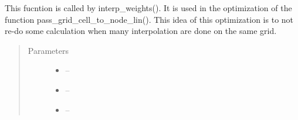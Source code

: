 \documentclass[letterpaper,10pt,english]{sphinxmanual}
\begin{document}
\begin{fulllineitems}
\label{\detokenize{index:src.manage_grid_8.interpolate_opti}}
This fucntion is called by interp\_weights(). It is used in the optimization of the function pass\_grid\_cell\_to\_node\_lin().
This idea of this optimization is to not re-do some calculation when many interpolation are done on the same grid.
\begin{quote}\begin{description}
\item[{Parameters}] \leavevmode\begin{itemize}
\item {} 
 -- 

\item {} 
 -- 

\item {} 
 -- 

\end{itemize}

\end{description}\end{quote}

\end{fulllineitems}

\end{document}
